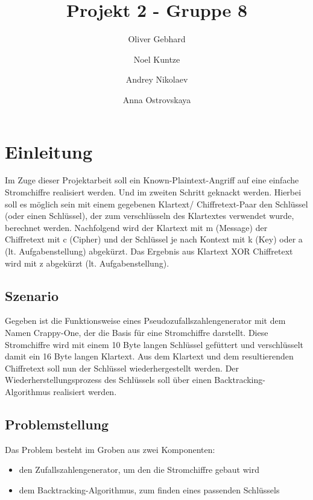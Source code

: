 \documentclass[a4paper,12pt]{article}
\begin{document}
\title{Projekt 2 - Gruppe 8}
\author{ Oliver Gebhard \and Noel Kuntze \and
Andrey Nikolaev \and Anna Ostrovskaya }
\maketitle


\newpage
\tableofcontents

\newpage
\setcounter{tocdepth}{2}

\newpage

\section{Einleitung}

Im Zuge dieser Projektarbeit soll ein Known-Plaintext-Angriff auf eine einfache Stromchiffre realisiert werden.
Und im zweiten Schritt geknackt werden.
Hierbei soll es möglich sein mit einem gegebenen Klartext/ Chiffretext-Paar den Schlüssel (oder einen Schlüssel), der zum verschlüsseln des Klartextes verwendet wurde, berechnet werden.
Nachfolgend wird der Klartext mit m (Message) der Chiffretext mit c (Cipher) und der Schlüssel je nach Kontext mit k (Key) oder a (lt. Aufgabenstellung) abgekürzt.
Das Ergebnis aus Klartext XOR Chiffretext wird mit z abgekürzt (lt. Aufgabenstellung).

\subsection{Szenario}

Gegeben ist die Funktionsweise eines Pseudozufallszahlengenerator mit dem Namen Crappy-One, der die Basis für eine Stromchiffre darstellt.
Diese Stromchiffre wird mit einem 10 Byte langen Schlüssel gefüttert und verschlüsselt damit ein 16 Byte langen Klartext.
Aus dem Klartext und dem resultierenden Chiffretext soll nun der Schlüssel wiederhergestellt werden.
Der Wiederherstellungsprozess des Schlüssels soll über einen Backtracking-Algorithmus realisiert werden.

\subsection{Problemstellung}

Das Problem besteht im Groben aus zwei Komponenten: 
\begin{itemize}
\item den Zufallszahlengenerator, um den die Stromchiffre gebaut wird
\item dem Backtracking-Algorithmus, zum finden eines passenden Schlüssels
\end{itemize}
\end{document}
